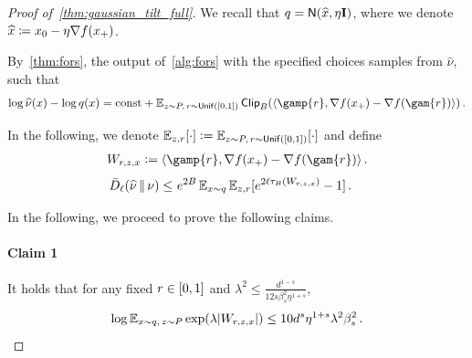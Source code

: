 \begin{proof}[Proof of~\cref{thm:gaussian_tilt_full}]
We recall that $q=\normal{\xhat,\eta\Id}$, where we denote $\widehat x \coloneqq x_0 - \eta\nabla f(x_+)$.

By~\cref{thm:fors}, the output of~\cref{alg:fors} with the specified choices samples from $\widehat\nu$, such that
\begin{align*}
    \log \wh\nu(x)-\log q(x)=\const+\En_{z\sim P,\,r\sim\unif([0,1])}\pclip{\tri{\gamp{\lr}, \nabla f(\xp)-\nabla f(\gam{\lr})}}\,.
\end{align*}


In the following, we denote $\operatorname{\mathbb{E}}_{z,r}[\cdot]\vcentcolon= \operatorname{\mathbb{E}}_{z\sim P,\,r\sim\mathsf{Unif}([0,1])}[\cdot]$ and define
\begin{align*}
    W_{r,z,x}
    \ldef\tri{\gamp{\lr}, \nabla f(\xp) - \nabla f(\gam{\lr})}\,.
\end{align*}
\begin{align}\label{pfeq:RGO-Renyi}
\begin{aligned}
    \Dsys[\ell]{\nuhat}{\nu}
    \leq&~ e^{2B}\En_{x\sim q}\En_{z,r}\brk{ e^{2\ell\trunc{W_{r,z,x}}}-1 }\,.
\end{aligned}
\end{align}

In the following, we proceed to prove the following claims.

\paragraph{Claim 1}
It holds that for any fixed $r\in[0,1]$ and $\lambda^2\leq \frac{d^{1-s}}{12s\beta_s^2\eta^{1+s}}$,
\begin{align*}
    \log \En_{x\sim q,\,z\sim P}\exp\prn*{\lambda \abs{W_{r,z,x}}}\leq 10 d^s \eta^{1+s}\lambda^2\beta_s^2\,.
\end{align*}


\end{proof}
